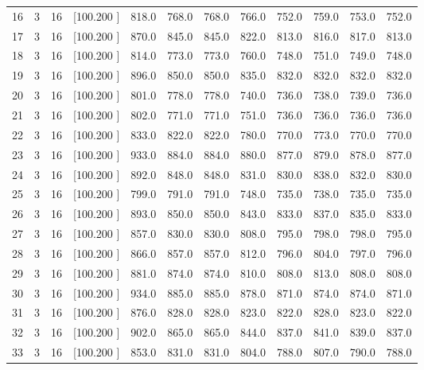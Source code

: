 \documentclass[12pt,a4paper]{article}
\begin{document}
\begin{center}
{\begin{tabular}{r r r r r r r r r r r r}
  16&  3& 16&[100.200   ]&   818.0&   768.0&   768.0&   766.0&   752.0&   759.0&   753.0&   752.0\\[-0.02in]
  17&  3& 16&[100.200   ]&   870.0&   845.0&   845.0&   822.0&   813.0&   816.0&   817.0&   813.0\\[-0.02in]
  18&  3& 16&[100.200   ]&   814.0&   773.0&   773.0&   760.0&   748.0&   751.0&   749.0&   748.0\\[-0.02in]
  19&  3& 16&[100.200   ]&   896.0&   850.0&   850.0&   835.0&   832.0&   832.0&   832.0&   832.0\\[-0.02in]
  20&  3& 16&[100.200   ]&   801.0&   778.0&   778.0&   740.0&   736.0&   738.0&   739.0&   736.0\\[-0.02in]
  21&  3& 16&[100.200   ]&   802.0&   771.0&   771.0&   751.0&   736.0&   736.0&   736.0&   736.0\\[-0.02in]
  22&  3& 16&[100.200   ]&   833.0&   822.0&   822.0&   780.0&   770.0&   773.0&   770.0&   770.0\\[-0.02in]
  23&  3& 16&[100.200   ]&   933.0&   884.0&   884.0&   880.0&   877.0&   879.0&   878.0&   877.0\\[-0.02in]
  24&  3& 16&[100.200   ]&   892.0&   848.0&   848.0&   831.0&   830.0&   838.0&   832.0&   830.0\\[-0.02in]
  25&  3& 16&[100.200   ]&   799.0&   791.0&   791.0&   748.0&   735.0&   738.0&   735.0&   735.0\\[-0.02in]
  26&  3& 16&[100.200   ]&   893.0&   850.0&   850.0&   843.0&   833.0&   837.0&   835.0&   833.0\\[-0.02in]
  27&  3& 16&[100.200   ]&   857.0&   830.0&   830.0&   808.0&   795.0&   798.0&   798.0&   795.0\\[-0.02in]
  28&  3& 16&[100.200   ]&   866.0&   857.0&   857.0&   812.0&   796.0&   804.0&   797.0&   796.0\\[-0.02in]
  29&  3& 16&[100.200   ]&   881.0&   874.0&   874.0&   810.0&   808.0&   813.0&   808.0&   808.0\\[-0.02in]
  30&  3& 16&[100.200   ]&   934.0&   885.0&   885.0&   878.0&   871.0&   874.0&   874.0&   871.0\\[-0.02in]
  31&  3& 16&[100.200   ]&   876.0&   828.0&   828.0&   823.0&   822.0&   828.0&   823.0&   822.0\\[-0.02in]
  32&  3& 16&[100.200   ]&   902.0&   865.0&   865.0&   844.0&   837.0&   841.0&   839.0&   837.0\\[-0.02in]
  33&  3& 16&[100.200   ]&   853.0&   831.0&   831.0&   804.0&   788.0&   807.0&   790.0&   788.0\\[-0.02in]

\end{tabular}}
\end{center}
\end{document}
